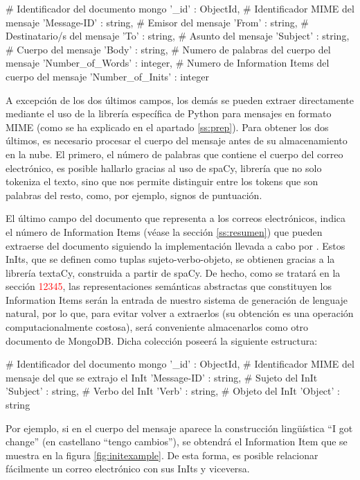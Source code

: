 \begin{python}
{
	# Identificador del documento mongo
	'_id' : ObjectId,
	# Identificador MIME del mensaje
	'Message-ID' : string,
	# Emisor del mensaje
	'From' : string,
	# Destinatario/s del mensaje
	'To' : string,
	# Asunto del mensaje
	'Subject' : string,
	# Cuerpo del mensaje
	'Body' : string,
	# Numero de palabras del cuerpo del mensaje
	'Number_of_Words' : integer,
	# Numero de Information Items del cuerpo del mensaje
	'Number_of_Inits' : integer
}
\end{python}

A excepción de los dos últimos campos, los demás se pueden extraer directamente mediante el uso de la librería específica de Python para mensajes en formato MIME (como se ha explicado en el apartado \ref{ss:prep}). Para obtener los dos últimos, es necesario procesar el cuerpo del mensaje antes de su almacenamiento en la nube. El primero, el número de palabras que contiene el cuerpo del correo electrónico, es posible hallarlo gracias al uso de spaCy, librería que no solo tokeniza el texto, sino que nos permite distinguir entre los tokens que son palabras del resto, como, por ejemplo, signos de puntuación.

El último campo del documento que representa a los correos electrónicos, indica el número de Information Items (véase la sección \ref{ss:resumen}) que pueden extraerse del documento siguiendo la implementación llevada a cabo por \cite{genest2010text}. Estos InIts, que se definen como tuplas sujeto-verbo-objeto, se obtienen gracias a la librería textaCy, construida a partir de spaCy. De hecho, como se tratará en la sección \textcolor{red}{12345}, las representaciones semánticas abstractas que constituyen los Information Items serán la entrada de nuestro sistema de generación de lenguaje natural, por lo que, para evitar volver a extraerlos (su obtención es una operación computacionalmente costosa), será conveniente almacenarlos como otro documento de MongoDB. Dicha colección poseerá la siguiente estructura:

\begin{python}
	{
		# Identificador del documento mongo
		'_id' : ObjectId,
		# Identificador MIME del mensaje del que se extrajo el InIt
		'Message-ID' : string,
		# Sujeto del InIt
		'Subject' : string,
		# Verbo del InIt
		'Verb' : string,
		# Objeto del InIt
		'Object' : string
	}
\end{python}

Por ejemplo, si en el cuerpo del mensaje aparece la construcción lingüística ``I got change'' (en castellano ``tengo cambios''), se obtendrá el Information Item que se muestra en la figura \ref{fig:initexample}. De esta forma, es posible relacionar fácilmente un correo electrónico con sus InIts y viceversa.

